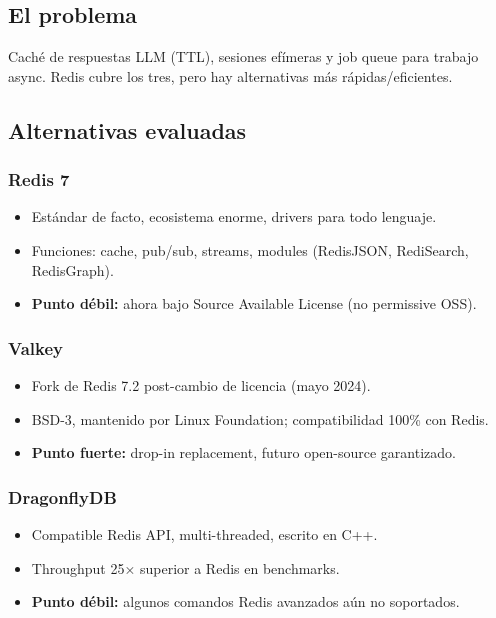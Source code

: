 \documentclass[11pt,a4paper]{article}
\begin{document}
\subsection{El problema}

Caché de respuestas LLM (TTL), sesiones efímeras y job queue para trabajo async. Redis cubre los tres, pero hay alternativas más rápidas/eficientes.

\subsection{Alternativas evaluadas}

\subsubsection{Redis 7}
\begin{itemize}[leftmargin=*,itemsep=0pt]
\item Estándar de facto, ecosistema enorme, drivers para todo lenguaje.
\item Funciones: cache, pub/sub, streams, modules (RedisJSON, RediSearch, RedisGraph).
\item \textbf{Punto débil:} ahora bajo Source Available License (no permissive OSS).
\end{itemize}

\subsubsection{Valkey}
\begin{itemize}[leftmargin=*,itemsep=0pt]
\item Fork de Redis 7.2 post-cambio de licencia (mayo 2024).
\item BSD-3, mantenido por Linux Foundation; compatibilidad 100\% con Redis.
\item \textbf{Punto fuerte:} drop-in replacement, futuro open-source garantizado.
\end{itemize}

\subsubsection{DragonflyDB}
\begin{itemize}[leftmargin=*,itemsep=0pt]
\item Compatible Redis API, multi-threaded, escrito en C++.
\item Throughput 25× superior a Redis en benchmarks.
\item \textbf{Punto débil:} algunos comandos Redis avanzados aún no soportados.
\end{itemize}
\end{document}
